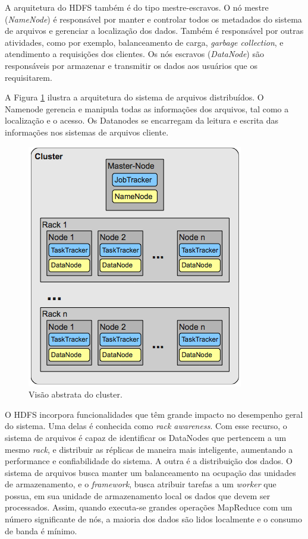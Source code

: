 A arquitetura do HDFS também é do tipo mestre-escravos.
O nó mestre (\textit{NameNode}) é responsável por manter e controlar todos os metadados do sistema de arquivos e gerenciar a localização dos dados. Também é responsável por outras atividades, como por exemplo, balanceamento de carga, \textit{garbage collection}, e atendimento a requisições dos clientes.
Os nós escravos (\textit{DataNode}) são responsáveis por armazenar e transmitir os dados aos usuários que os requisitarem.

A Figura \ref{fig:hdfs} ilustra a arquitetura do sistema de arquivos distribuídos.
O Namenode gerencia e manipula todas as informações dos arquivos, tal como a localização e o acesso. Os Datanodes se encarregam da leitura e escrita das informações nos sistemas de arquivos cliente.

\begin{figure}[htb]
\centering
\includegraphics[scale=.65]{figuras/HadoopCluster.png}
\caption{Visão abstrata do cluster.}
\label{fig:hdfs}
\end{figure}

O HDFS incorpora funcionalidades que têm grande impacto no desempenho geral do sistema.
Uma delas é conhecida como \textit{rack awareness}. Com esse recurso, o sistema de arquivos é capaz de identificar os DataNodes que pertencem a um mesmo \textit{rack}, e distribuir as réplicas de maneira mais inteligente, aumentando a performance e confiabilidade do sistema.
A outra é a distribuição dos dados. O sistema de arquivos busca manter um balanceamento na ocupação das unidades de armazenamento, e o \textit{framework}, busca atribuir tarefas a um \textit{worker} que possua, em sua unidade de armazenamento local os dados que devem ser processados.
Assim, quando executa-se grandes operações MapReduce com um número significante de nós, a maioria dos dados são lidos localmente e o consumo de banda é mínimo.





